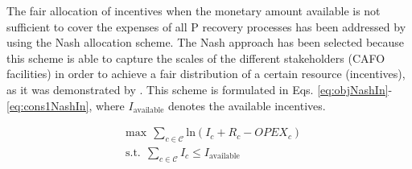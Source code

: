 \begin{refsection}[referencesCh5]
The fair allocation of incentives when the monetary amount available is not sufficient to cover the expenses of all P recovery processes has been addressed by using the Nash allocation scheme. The Nash approach has been selected because this scheme is able to capture the scales of the different stakeholders (CAFO facilities) in order to achieve a fair distribution of a certain resource (incentives), as it was demonstrated by \citet{sampat2019fairness}. This scheme is formulated in Eqs. \ref{eq:objNashIn}-\ref{eq:cons1NashIn}, where $I_{\text{available}}$ denotes the available incentives.

\begin{subequations}
	\begin{align}
	& \text{max} \ \ \sum_{c \in \mathcal{C}} \text{ln} \left(I_{c} + R_{c} - OPEX_{c}\right)  \label{eq:objNashIn} \\
	& \text{s.t.} \ \ \sum_{c \in \mathcal{C}} I_{c} \leq I_{\text{available}} \label{eq:cons1NashIn}
	\end{align}
\end{subequations}


\end{refsection}
